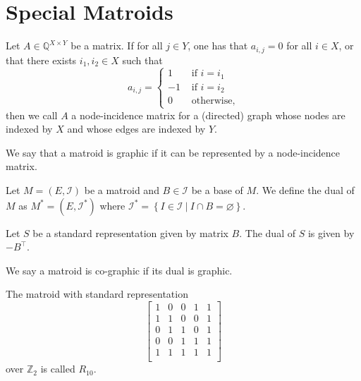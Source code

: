 \chapter{Special Matroids}

\begin{definition}
    \label{Matrix.IsGraphic}
    \leanok
    Let $A \in \mathbb{Q}^{X \times Y}$ be a matrix. If for all $j \in Y$, one has that $a_{i,j} = 0$ for all $i \in X$, or that there exists $i_1,i_2 \in X$ such that
    \[
    a_{i,j} = \begin{cases}
        1 & \text{ if $i = i_1$} \\
        -1 & \text{ if $i = i_2$} \\
        0 & \text{ otherwise},
    \end{cases}
    \]
    then we call $A$ a node-incidence matrix for a (directed) graph whose nodes are indexed by $X$ and whose edges are indexed by $Y$.
\end{definition}

\begin{definition}
    \label{Matroid.IsGraphic}
    \leanok
    We say that a matroid is graphic if it can be represented by a node-incidence matrix.
\end{definition}

\begin{definition}
    \label{Matroid.dualIndepMatroid}
    \leanok
    Let $M = (E, \mathcal{I})$ be a matroid and $B \in \mathcal I$ be a base of $M$. We define the dual of $M$ as $M^* = (E, \mathcal{I}^*)$ where $\mathcal{I}^* = \left\{ I \in \mathcal I  \ | \ I \cap B = \varnothing \right\}.$
\end{definition}

\begin{definition}
    \label{StandardRepr.dual}
    \leanok
    Let $S$ be a standard representation given by matrix $B$. The dual of $S$ is given by $-B^\intercal$.
\end{definition}

\begin{definition}
    \label{Matroid.IsCographic}
    \leanok
    We say a matroid is co-graphic if its dual is graphic.
\end{definition}

\begin{definition}
    \label{matroidR10}
    \leanok
    The matroid with standard representation
        \[\begin{bmatrix}
            1 & 0 & 0 & 1 & 1 \\
            1 & 1 & 0 & 0 & 1 \\
            0 & 1 & 1 & 0 & 1 \\
            0 & 0 & 1 & 1 & 1 \\
            1 & 1 & 1 & 1 & 1 \\
        \end{bmatrix}\]
        over $\mathbb{Z}_2$ is called $R_{10}.$
    \end{definition}

